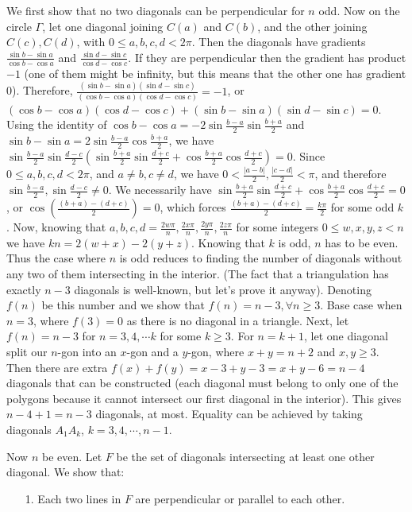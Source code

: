 \documentclass[11pt,a4paper]{article}
\begin{document}
\begin{itemize}
We first show that no two diagonals can be perpendicular for $n$ odd. 
Now on the circle $\Gamma$, let one diagonal joining $C(a)$ and $C(b)$, and the other joining $C(c), C(d)$, 
with $0\le a, b, c, d<2\pi$. 
Then the diagonals have gradients $\frac{\sin b-\sin a}{\cos b-\cos a}$ 
and $\frac{\sin d-\sin c}{\cos d-\cos c}$. 
If they are perpendicular then the gradient has product $-1$ (one of them might be infinity, but this means that the other one has gradient 0). 
Therefore, 
$\frac{(\sin b-\sin a)(\sin d-\sin c)}{(\cos b-\cos a)(\cos d-\cos c)}=-1$, or $(\cos b-\cos a)(\cos d-\cos c)+(\sin b-\sin a)(\sin d-\sin c)=0$. 
Using the identity of $\cos b-\cos a=-2\sin\frac{b-a}{2}\sin\frac{b+a}{2}$ and 
$\sin b-\sin a=2\sin\frac{b-a}{2}\cos\frac{b+a}{2}$, we have 
$\sin\frac{b-a}{2}\sin\frac{d-c}{2}(\sin\frac{b+a}{2}\sin\frac{d+c}{2}+\cos\frac{b+a}{2}\cos\frac{d+c}{2})=0$. 
Since $0\le a,b,c,d<2\pi$, and $a\neq b, c\neq d$, 
we have $0< \frac{|a-b|}2, \frac{|c-d|}2 < \pi$, and therefore 
$\sin\frac{b-a}{2}, \sin\frac{d-c}{2}\neq 0$. 
We necessarily have 
$\sin\frac{b+a}{2}\sin\frac{d+c}{2}+\cos\frac{b+a}{2}\cos\frac{d+c}{2}=0$, or 
$\cos (\frac{(b+a)-(d+c)}2)=0$, which forces 
$\frac{(b+a)-(d+c)}2=\frac{k\pi}2$ for some odd $k$. 
Now, knowing that $a, b, c, d=\frac{2w\pi}{n}, \frac{2x\pi}{n}, \frac{2y\pi}{n}, \frac{2z\pi}{n}$ for some integers $0\le w, x, y, z<n$ we have 
$kn=2(w+x)-2(y+z)$. 
Knowing that $k$ is odd, $n$ has to be even. 
Thus the case where $n$ is odd reduces to finding the number of diagonals without any two of them intersecting in the interior. 
(The fact that a triangulation has exactly $n-3$ diagonals is well-known, but let's prove it anyway). 
Denoting $f(n)$ be this number and we show that $f(n)=n-3, \forall n\ge 3$. 
Base case when $n=3$, where $f(3)=0$ as there is no diagonal in a triangle. 
Next, let $f(n)=n-3$ for $n=3, 4, \cdots k$ for some $k\ge 3$. 
For $n=k+1$, let one diagonal split our $n$-gon into an $x$-gon and a $y$-gon, where $x+y=n+2$ and $x, y\ge 3$. 
Then there are extra $f(x)+f(y)=x-3+y-3=x+y-6=n-4$ diagonals that can be constructed (each diagonal must belong to only one of the polygons because it cannot intersect our first diagonal in the interior). 
This gives $n-4+1=n-3$ diagonals, at most. 
Equality can be achieved by taking diagonals $A_1A_k$, $k=3, 4, \cdots , n-1$.

Now $n$ be even. Let $F$ be the set of diagonals intersecting at least one other diagonal. We show that: 
\begin{itemize}
\item [1.]
Each two lines in $F$ are perpendicular or parallel to each other. 


\end{itemize}
\end{itemize}
\end{document}
